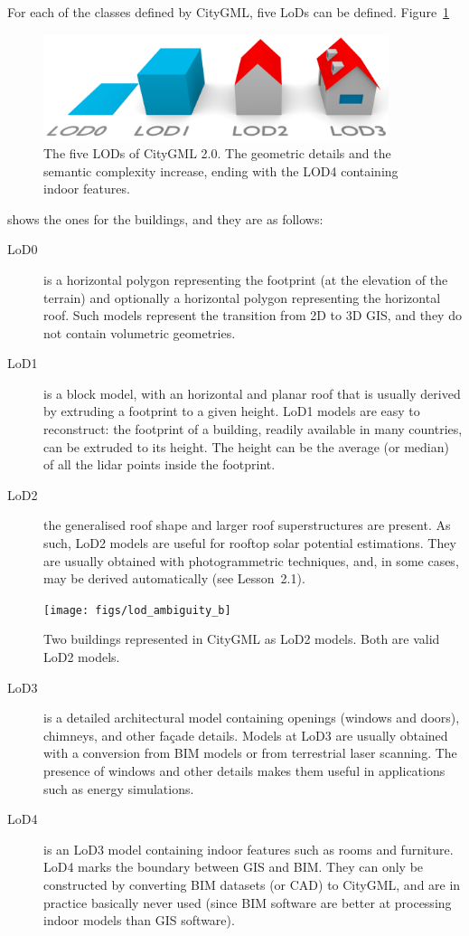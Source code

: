 For each of the classes defined by CityGML, five LoDs can be defined.
Figure~\ref{fig:officiallods}
\begin{figure}[h]
  \centering
  \includegraphics[width=0.9\textwidth]{figs/CityGML-LODs-c3.png}
  \caption{The five LODs of CityGML 2.0. The geometric details and the semantic complexity increase, ending with the LOD4 containing indoor features.}%
\label{fig:officiallods}
\end{figure}
shows the ones for the buildings, and they are as follows:
\begin{description}
  \item[LoD0] is a horizontal polygon representing the footprint (at the elevation of the terrain) and optionally a horizontal polygon representing the horizontal roof.
  Such models represent the transition from 2D to 3D GIS, and they do not contain volumetric geometries.
  \item[LoD1] is a block model, with an horizontal and planar roof that is usually derived by extruding a footprint to a given height.
  LoD1 models are easy to reconstruct: the footprint of a building, readily available in many countries, can be extruded to its height. The height can be the average (or median) of all the lidar points inside the footprint.
  \item[LoD2] the generalised roof shape and larger roof superstructures are present.
  As such, LoD2 models are useful for rooftop solar potential estimations.
  They are usually obtained with photogrammetric techniques, and, in some cases, may be derived automatically (see Lesson~2.1). 
  \begin{marginfigure}
    \centering
    \texttt{[image: figs/lod\_ambiguity\_b]}
    \caption{Two buildings represented in CityGML as LoD2 models. Both are valid LoD2 models.}%
  \label{fig:lod_ambiguity}
  \end{marginfigure}
  \item[LoD3] is a detailed architectural model containing openings (windows and doors), chimneys, and other façade details.
  Models at LoD3 are usually obtained with a conversion from BIM models or from terrestrial laser scanning.
  The presence of windows and other details makes them useful in applications such as energy simulations.
  \item[LoD4] is an LoD3 model containing indoor features such as rooms and furniture.
  LoD4 marks the boundary between GIS and BIM\@.
  They can only be constructed by converting BIM datasets (or CAD) to CityGML, and are in practice basically never used (since BIM software are better at processing indoor models than GIS software).
\end{description}

